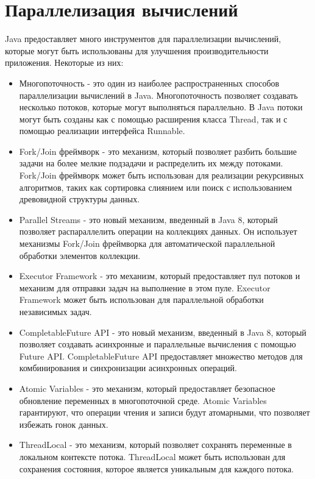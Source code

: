 \section{Параллелизация вычислений}
Java предоставляет много инструментов для параллелизации вычислений, которые могут быть использованы для улучшения производительности приложения. Некоторые из них:
\begin{itemize}
\item Многопоточность - это один из наиболее распространенных способов параллелизации вычислений в Java. Многопоточность позволяет создавать несколько потоков, которые могут выполняться параллельно. В Java потоки могут быть созданы как с помощью расширения класса Thread, так и с помощью реализации интерфейса Runnable.
\item Fork/Join фреймворк - это механизм, который позволяет разбить большие задачи на более мелкие подзадачи и распределить их между потоками. Fork/Join фреймворк может быть использован для реализации рекурсивных алгоритмов, таких как сортировка слиянием или поиск с использованием древовидной структуры данных.
\item Parallel Streams - это новый механизм, введенный в Java 8, который позволяет распараллелить операции на коллекциях данных. Он использует механизмы Fork/Join фреймворка для автоматической параллельной обработки элементов коллекции.
\item Executor Framework - это механизм, который предоставляет пул потоков и механизм для отправки задач на выполнение в этом пуле. Executor Framework может быть использован для параллельной обработки независимых задач.
\item CompletableFuture API - это новый механизм, введенный в Java 8, который позволяет создавать асинхронные и параллельные вычисления с помощью Future API. CompletableFuture API предоставляет множество методов для комбинирования и синхронизации асинхронных операций.
\item Atomic Variables - это механизм, который предоставляет безопасное обновление переменных в многопоточной среде. Atomic Variables гарантируют, что операции чтения и записи будут атомарными, что позволяет избежать гонок данных.
\item ThreadLocal - это механизм, который позволяет сохранять переменные в локальном контексте потока. ThreadLocal может быть использован для сохранения состояния, которое является уникальным для каждого потока.
\end{itemize}


